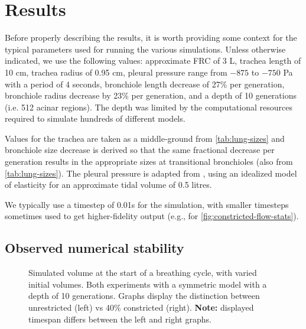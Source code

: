 %
\section{Results} \label{sec:results}

Before properly describing the results, it is worth providing some context for the typical
parameters used for running the various simulations. Unless otherwise indicated, we use the
following values: approximate FRC of 3 L, trachea length of 10 cm, trachea radius of 0.95 cm,
pleural pressure range from $-875$ to $-750$ Pa with a period of 4 seconds, bronchiole length
decrease of 27\% per generation, bronchiole radius decrease by 23\% per generation, and a depth of
10 generations (i.e. 512 acinar regions). The depth was limited by the computational resources
required to simulate hundreds of different models.

Values for the trachea are taken as a middle-ground from \autoref{tab:lung-sizes} and bronchiole
size decrease is derived so that the same fractional decrease per generation results in the
appropriate sizes at transitional bronchioles (also from \autoref{tab:lung-sizes}). The pleural
pressure is adapted from \cite{BenTal2006}, using an idealized model of elasticity for an
approximate tidal volume of 0.5 litres.

We typically use a timestep of 0.01s for the simulation, with smaller timesteps sometimes used to
get higher-fidelity output (e.g., for \autoref{fig:constricted-flow-stats}).

\subsection{Observed numerical stability}

\begin{figure}[ht!]
    \centering
    \begin{tikzpicture}[scale=0.8]
        
        
    \end{tikzpicture}
    \caption{
        Simulated volume at the start of a breathing cycle, with varied initial volumes. Both
        experiments with a symmetric model with a depth of 10 generations. Graphs display the
        distinction between unrestricted (left) vs 40\% constricted (right). \textbf{Note:}
        displayed timespan differs between the left and right graphs.
    }
    \label{fig:different-initial-volumes}
\end{figure}

